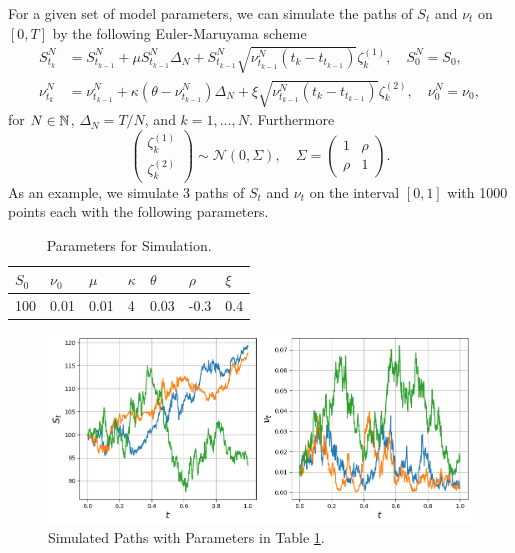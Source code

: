 For a given set of model parameters, we can simulate the paths of $S_{t}$ and $\nu_{t}$ on $[0,T]$ by the following Euler-Maruyama scheme
\begin{align}
    S_{t_{k}}^{N}&= S_{t_{k-1}}^{N} + \mu S_{t_{k-1}}^{N}\Delta_{N} + S_{t_{k-1}}^{N}\sqrt{\nu_{t_{k-1}}^{N}\left(t_{k}-t_{t_{k-1}}\right)}\zeta_{k}^{(1)}, \quad S_{0}^{N}=S_{0},\\
    \nu_{t_{k}}^{N}&= \nu_{t_{k-1}}^{N} + \kappa(\theta-\nu_{t_{k-1}}^{N})\Delta_{N} + \xi\sqrt{\nu_{t_{k-1}}^{N}\left(t_{k}-t_{t_{k-1}}\right)}\zeta_{k}^{(2)}, \quad \nu_{0}^{N}=\nu_{0},
\end{align}
for $N\in\mathbb{N}$, $\Delta_{N}=T/N$, and $k=1,\dots,N$. Furthermore
\begin{equation}
    \begin{pmatrix}
        \zeta_{k}^{(1)}\\
        \zeta_{k}^{(2)}
    \end{pmatrix} \sim \mathcal{N}(0,\Sigma),\quad \Sigma = \begin{pmatrix}
        1 & \rho \\
        \rho & 1
    \end{pmatrix}.
\end{equation}
As an example, we simulate 3 paths of $S_{t}$ and $\nu_{t}$ on the interval $[0,1]$ with 1000 points each with the following parameters.
\begin{table}[H]
\centering
\begin{tabular}{@{}lllllll@{}}
\toprule
$S_{0}$  & $\nu_{0}$   & $\mu$   & $\kappa$ & $\theta$ & $\rho$  & $\xi$ \\ \midrule
100 & 0.01 & 0.01 & 4     & 0.03  & -0.3 & 0.4   \\ \bottomrule
\end{tabular}
\caption{Parameters for Simulation.}
\label{heston_tabel}
\end{table}

\begin{figure}[H]
    \centering
    \includegraphics[scale=0.53]{fig/img/HestonModel/heston_simulationsflottere.png}
    \caption{Simulated Paths with Parameters in Table \ref{heston_tabel}.}
    \label{fig:heston_simsl}
\end{figure}

